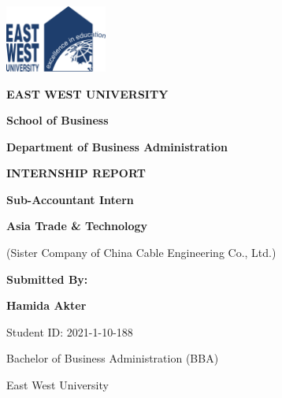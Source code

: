 
\begin{titlepage}
    \centering
    
    \vspace*{1.5cm}
    \includegraphics[width=0.25\textwidth]{assets/images/ewu_logo.png}
    
    \vspace{0.8cm}
    {\Large \textbf{EAST WEST UNIVERSITY}}
    
    \vspace{0.4cm}
    {\large \textbf{School of Business}}
    
    \vspace{0.3cm}
    {\normalsize \textbf{Department of Business Administration}}
    
    \vspace{1.5cm}
    {\Large \textbf{INTERNSHIP REPORT}}
    
    \vspace{0.8cm}
    {\large \textbf{Sub-Accountant Intern}}
    
    \vspace{0.4cm}
    {\normalsize \textbf{Asia Trade \& Technology}}
    
    \vspace{0.3cm}
    {\normalsize (Sister Company of China Cable Engineering Co., Ltd.)}
    
    \vspace{1.5cm}
    \begin{minipage}{0.8\textwidth}
        \centering
        {\large \textbf{Submitted By:}}
        
        \vspace{0.4cm}
        {\large \textbf{Hamida Akter}}
        
        \vspace{0.3cm}
        {\normalsize Student ID: 2021-1-10-188}
        
        \vspace{0.3cm}
        {\normalsize Bachelor of Business Administration (BBA)}
        
        \vspace{0.3cm}
        {\normalsize East West University}
    \end{minipage}
    

\end{titlepage}
